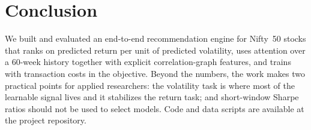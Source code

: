 \documentclass[conference]{IEEEtran}
\begin{document}
\section{Conclusion}
We built and evaluated an end-to-end recommendation engine for Nifty~50 stocks that ranks on predicted return per unit of predicted volatility, uses attention over a 60-week history together with explicit correlation-graph features, and trains with transaction costs in the objective. \RESULTSCONC{} Beyond the numbers, the work makes two practical points for applied researchers: the volatility task is where most of the learnable signal lives and it stabilizes the return task; and short-window Sharpe ratios should not be used to select models. Code and data scripts are available at the project repository.
\end{document}

